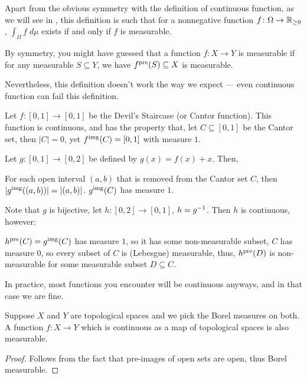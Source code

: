Apart from the obvious symmetry with the definition of continuous function,
as we will see in , this definition is such that
for a nonnegative function $f \colon \Omega \to \mathbb R_{\geq 0}$,
$\int_\Omega f \; d\mu$ exists if and only if $f$ is measurable.

\begin{remark}
	By symmetry, you might have guessed that a function $f: X \to Y$ is measurable if for any measurable
	$S \subseteq Y$, we have $f^{\text{pre}}(S) \subseteq X$ is measurable.

	Nevertheless, this definition doesn't work the way we expect --- even continuous function can fail
	this definition.
\end{remark}
\begin{example}
	Let $f \colon [0, 1] \to [0, 1]$ be the Devil's Staircase (or Cantor function).
	This function is continuous, and has the property that, let $C \subseteq [0, 1]$ be the Cantor set,
	then $|C| = 0$, yet $f^{\text{img}}(C) = [0, 1]$ with measure $1$.

	Let $g \colon [0, 1] \to [0, 2]$ be defined by $g(x) = f(x) + x$. Then,
	\begin{itemize}
		\ii For each open interval $(a, b)$ that is removed from the Cantor set $C$, then $|g^{\text{img}}((a,
		b))| = |(a, b)|$.
		\ii $g^{\text{img}}(C)$ has measure $1$.
	\end{itemize}

	Note that $g$ is bijective, let $h \colon [0, 2] \to [0, 1]$, $h = g^{-1}$. Then $h$ is continuous,
	however:
	\begin{itemize}
		\ii $h^{\text{pre}}(C) = g^{\text{img}}(C)$ has measure $1$, so it has some non-measurable subset,
		\ii $C$ has measure $0$, so every subset of $C$ is (Lebesgue) measurable,
		\ii thus, $h^{\text{pre}}(D)$ is non-measurable for some measurable subset $D \subseteq C$.
	\end{itemize}
\end{example}

In practice, most functions you encounter will be continuous anyways,
and in that case we are fine.
\begin{proposition}
	Suppose $X$ and $Y$ are topological spaces
	and we pick the Borel measures on both.
	A function $f \colon X \to Y$
	which is continuous as a map of topological spaces
	is also measurable.
\end{proposition}
\begin{proof}
	Follows from the fact that pre-images of open sets are open, thus Borel measurable.
\end{proof}

